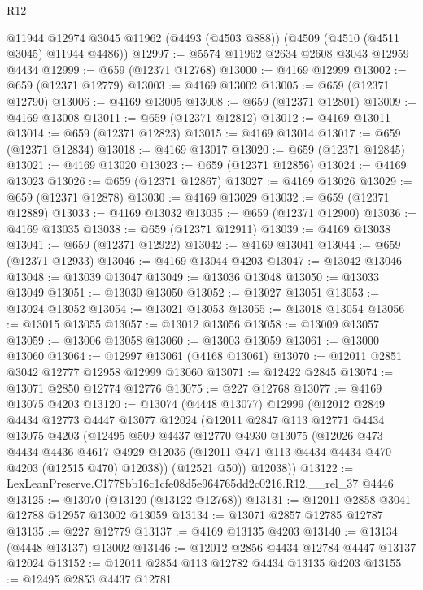 \begin{lexlean}{R12}
\begin{coremodule}
    @11944
    @12974
    @3045
    @11962
    (@4493 (@4503 @888))
    (@4509 (@4510 (@4511 @3045) @11944 @4486))
@12997 := @5574 @11962 @2634 @2608 @3043 @12959 @4434
@12999 := @659 (@12371 @12768)
@13000 := @4169 @12999
@13002 := @659 (@12371 @12779)
@13003 := @4169 @13002
@13005 := @659 (@12371 @12790)
@13006 := @4169 @13005
@13008 := @659 (@12371 @12801)
@13009 := @4169 @13008
@13011 := @659 (@12371 @12812)
@13012 := @4169 @13011
@13014 := @659 (@12371 @12823)
@13015 := @4169 @13014
@13017 := @659 (@12371 @12834)
@13018 := @4169 @13017
@13020 := @659 (@12371 @12845)
@13021 := @4169 @13020
@13023 := @659 (@12371 @12856)
@13024 := @4169 @13023
@13026 := @659 (@12371 @12867)
@13027 := @4169 @13026
@13029 := @659 (@12371 @12878)
@13030 := @4169 @13029
@13032 := @659 (@12371 @12889)
@13033 := @4169 @13032
@13035 := @659 (@12371 @12900)
@13036 := @4169 @13035
@13038 := @659 (@12371 @12911)
@13039 := @4169 @13038
@13041 := @659 (@12371 @12922)
@13042 := @4169 @13041
@13044 := @659 (@12371 @12933)
@13046 := @4169 @13044 @4203
@13047 := @13042 @13046
@13048 := @13039 @13047
@13049 := @13036 @13048
@13050 := @13033 @13049
@13051 := @13030 @13050
@13052 := @13027 @13051
@13053 := @13024 @13052
@13054 := @13021 @13053
@13055 := @13018 @13054
@13056 := @13015 @13055
@13057 := @13012 @13056
@13058 := @13009 @13057
@13059 := @13006 @13058
@13060 := @13003 @13059
@13061 := @13000 @13060
@13064 := @12997 @13061 (@4168 @13061)
@13070 := @12011 @2851 @3042 @12777 @12958 @12999 @13060
@13071 := @12422 @2845
@13074 := @13071 @2850 @12774 @12776
@13075 := @227 @12768
@13077 := @4169 @13075 @4203
@13120 := @13074
    (@4448 @13077)
    @12999
    (@12012
      @2849
      @4434
      @12773
      @4447
      @13077
      @12024
      (@12011
        @2847
        @113
        @12771
        @4434
        @13075
        @4203
        (@12495
          @509
          @4437
          @12770
          @4930
          @13075
          (@12026
            @473
            @4434
            @4436
            @4617
            @4929
            @12036
            (@12011 @471 @113 @4434 @4434 @470 @4203 (@12515 @470) @12038))
          (@12521 @50))
        @12038))
@13122 := LexLeanPreserve.C1778bb16c1cfe08d5e964765dd2c0216.R12.__rel_37 @4446
@13125 := @13070 (@13120 (@13122 @12768))
@13131 := @12011 @2858 @3041 @12788 @12957 @13002 @13059
@13134 := @13071 @2857 @12785 @12787
@13135 := @227 @12779
@13137 := @4169 @13135 @4203
@13140 := @13134 (@4448 @13137) @13002
@13146 := @12012 @2856 @4434 @12784 @4447 @13137 @12024
@13152 := @12011 @2854 @113 @12782 @4434 @13135 @4203
@13155 := @12495 @2853 @4437 @12781

\end{coremodule}
\end{lexlean}
